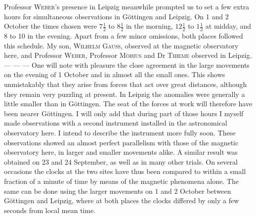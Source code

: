 Professor \textsc{Weber}’s presence in Leipzig meanwhile prompted us to set a few extra hours for simultaneous observations in Göttingen and Leipzig. On 1 and 2 October the times chosen were $7\tfrac12$ to $8\tfrac12$ in the morning, $12\tfrac12$ to $1\tfrac12$ at midday, and 8 to 10 in the evening. Apart from a few minor omissions, both places followed this schedule. My son, \textsc{Wilhelm Gauss}, observed at the magnetic observatory here, and Professor \textsc{Weber}, Professor \textsc{Möbius} and Dr \textsc{Thieme} observed in Leipzig. — — — One will note with pleasure the close agreement in the large movements on the evening of 1 October and in almost all the small ones. This shows unmistakably that they arise from forces that act over great distances, although they remain very puzzling at present. In Leipzig the anomalies were generally a little smaller than in Göttingen. The seat of the forces at work will therefore have been nearer Göttingen. I will only add that during part of those hours I myself made observations with a second instrument installed in the astronomical observatory here. I intend to describe the instrument more fully soon. These observations showed an almost perfect parallelism with those of the magnetic observatory here, in larger and smaller movements alike. A similar result was obtained on 23 and 24 September, as well as in many other trials. On several occasions the clocks at the two sites have thus been compared to within a small fraction of a minute of time by means of the magnetic phenomena alone. The same can be done using
the larger movements on 1 and 2 October between Göttingen and Leipzig, where at both places the clocks differed by only a few seconds from local mean time.

